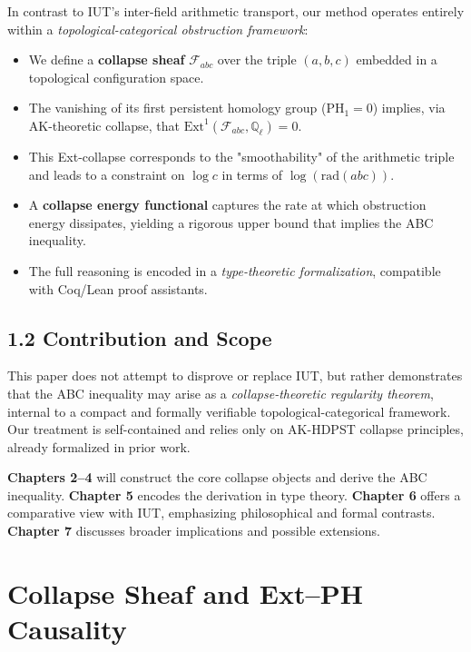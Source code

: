 \documentclass[11pt]{article}
\begin{document}
In contrast to IUT's inter-field arithmetic transport, our method operates entirely within a \emph{topological-categorical obstruction framework}:
\begin{itemize}
    \item We define a \textbf{collapse sheaf} $\mathcal{F}_{abc}$ over the triple $(a, b, c)$ embedded in a topological configuration space.
    \item The vanishing of its first persistent homology group ($\mathrm{PH}_1 = 0$) implies, via AK-theoretic collapse, that $\mathrm{Ext}^1(\mathcal{F}_{abc}, \mathbb{Q}_\ell) = 0$.
    \item This Ext-collapse corresponds to the "smoothability" of the arithmetic triple and leads to a constraint on $\log c$ in terms of $\log(\mathrm{rad}(abc))$.
    \item A \textbf{collapse energy functional} captures the rate at which obstruction energy dissipates, yielding a rigorous upper bound that implies the ABC inequality.
    \item The full reasoning is encoded in a \emph{type-theoretic formalization}, compatible with Coq/Lean proof assistants.
\end{itemize}

\subsection*{1.2 Contribution and Scope}
This paper does not attempt to disprove or replace IUT, but rather demonstrates that the ABC inequality may arise as a \emph{collapse-theoretic regularity theorem},
internal to a compact and formally verifiable topological-categorical framework. Our treatment is self-contained and relies only on AK-HDPST collapse principles, already formalized in prior work.

\textbf{Chapters 2--4} will construct the core collapse objects and derive the ABC inequality.\newline
\textbf{Chapter 5} encodes the derivation in type theory.\newline
\textbf{Chapter 6} offers a comparative view with IUT, emphasizing philosophical and formal contrasts.\newline
\textbf{Chapter 7} discusses broader implications and possible extensions.



\section{Collapse Sheaf and Ext--PH Causality}
\end{document}
